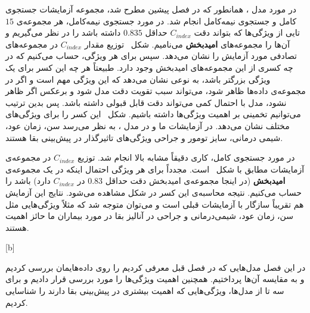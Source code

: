 در مورد مدل ، همانطور که در فصل پیشین مطرح شد، مجموعه آزمایشات جستجوی کامل و جستجوی نیمه‌کامل انجام شد. در مورد جستجوی نیمه‌کامل، هر مجموعه‌ی $15$‌تایی از ویژگی‌ها که بتواند دقت $C_{index}$ حداقل $0.835$ داشته باشد را در نظر می‌گیریم و آن‌ها را مجموعه‌های \textbf{امیدبخش} می‌نامیم. شکل~ توزیع مقدار $C_{index}$ در مجموعه‌های تصادفی مورد آزمایش را نشان می‌دهد. 
سپس برای هر ویژگی‌، حساب می‌کنیم که در چه کسری از این مجموعه‌های امیدبخش وجود دارد. طبیعتاً هر چه این کسر برای یک ویژگی بزرگتر باشد، به نوعی نشان می‌دهد که این ویژگی مهم است و اگر در مجموعه‌ی داده‌ها ظاهر شود، می‌تواند سبب تقویت دقت مدل شود و برعکس اگر ظاهر نشود، مدل با احتمال کمی می‌تواند دقت قابل قبولی داشته باشد. پس بدین ترتیب می‌توانیم تخمینی بر اهمیت ویژگی‌ها داشته باشیم.
شکل~ این کسر را برای ویژگی‌های مختلف نشان می‌دهد. در آزمایشات ما و در مدل ، به نظر می‌رسد سن، زمان عود، شیمی درمانی، سایز تومور و جراحی ویژگی‌های تاثیر‌گذار در پیش‌بینی بقا هستند.

در مورد جستجوی کامل، کاری دقیقاً مشابه بالا انجام شد. توزیع $C_{index}$ در مجموعه‌ی آزمایشات مطابق با شکل~ است. مجدداً برای هر ویژگی احتمال اینکه در یک مجموعه‌ی \textbf{امیدبخش} (در اینجا مجموعه‌ی امیدبخش دقت حداقل $0.83$ در $C_{index}$ دارد) باشد را حساب می‌کنیم. نتیجه محاسبه‌ی این کسر در شکل مشاهده می‌شود. نتایج این آزمایش هم تقریباً‌ سازگار با آزمایشات قبلی است و می‌توان متوجه شد که مثلاً‌ ویژگی‌هایی مثل سن، زمان عود، شیمی‌درمانی و جراحی در آنالیز بقا در مورد بیماران ما حائز اهمیت هستند.



[b]\centering



در این فصل مدل‌هایی که در فصل قبل معرفی کردیم را روی داده‌هایمان بررسی کردیم و به مقایسه آن‌ها پرداختیم. همچنین اهمیت ویژگی‌ها را مورد بررسی قرار دادیم و برای سه تا از مدل‌ها، ویژگی‌هایی که اهمیت بیشتری در پیش‌بینی بقا دارند را شناسایی کردیم.